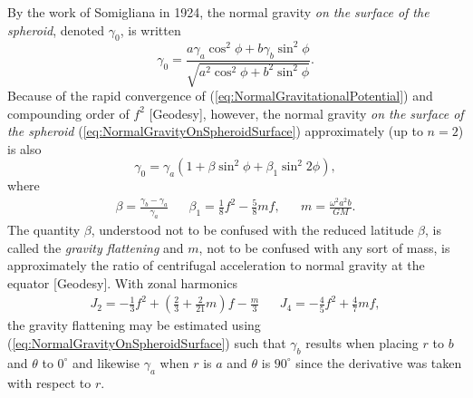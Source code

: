 \documentclass[11pt,dvipsnames]{thesis}
\begin{document}
By the work of Somigliana in 1924, the normal gravity \textit{on the surface of the spheroid}, denoted $\gamma_0$, is written
\begin{equation}
\gamma_0 = \frac{a \gamma_a \cos^2\phi + b\gamma_b \sin^2\phi}{\sqrt{a^2 \cos^2\phi + b^2\sin^2\phi}}. \label{eq:NormalSurfaceGravitySomig} 
\end{equation}
Because of the rapid convergence of (\ref{eq:NormalGravitationalPotential}) and compounding order of $f^2$ [Geodesy], however, the normal gravity \textit{on the surface of the spheroid} (\ref{eq:NormalGravityOnSpheroidSurface}) approximately (up to $n = 2$) is also
\begin{equation}
\gamma_0 = \gamma_a(1 + \beta \sin^2 \phi + \beta_1 \sin^2 2\phi), \label{eq:NormalSurfaceGravityApprox}
\end{equation}
where
\begin{align}
\beta = \frac{\gamma_b - \gamma_a}{\gamma_a} && \beta_1 = \frac{1}{8}f^2 - \frac{5}{8} m f, && m = \frac{\omega^2 a^2 b}{GM}. \label{eq:NormalGravityParametersBB1m}
\end{align}
The quantity $\beta$, understood not to be confused with the reduced latitude $\beta$, is called the \textit{gravity flattening} and $m$, not to be confused with any sort of mass, is approximately the ratio of centrifugal acceleration to normal gravity at the equator [Geodesy].
With zonal harmonics
\begin{align}
J_2 = - \frac{1}{3}f^2 + \left(\frac{2}{3} + \frac{2}{21}m\!\right)\!f - \frac{m}{3}  && J_4 = -\frac{4}{5}f^2 + \frac{4}{7}mf,
\end{align}
the gravity flattening may be estimated using (\ref{eq:NormalGravityOnSpheroidSurface}) such that $\gamma_b$ results when placing $r$ to $b$ and $\theta$ to $0^\circ$ and likewise $\gamma_a$ when $r$ is $a$ and $\theta$ is $90^\circ$ since the derivative was taken with respect to $r$.

\end{document}
